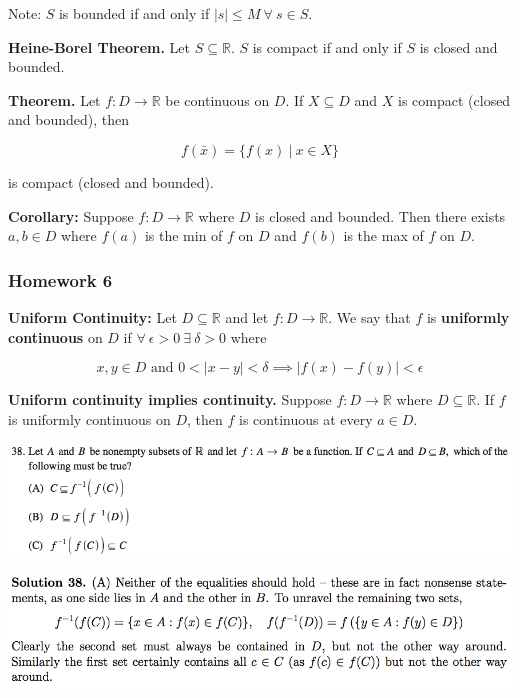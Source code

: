 \documentclass{article}
\begin{document}
Note: \(S\) is bounded if and only if \(|s| \leq M\  \forall \ s \in S \).

\textbf{Heine-Borel Theorem.} Let \(S \subseteq \mathbb{R}\). \(S\) is compact if and only if \(S\) is closed and bounded.


\textbf{Theorem.} Let \(f: D \to \mathbb{R}\) be continuous on \(D\). If \(X \subseteq D\) and \(X\) is compact (closed and bounded), then

\[
f(\bar{x}) = \{f(x) \ | \ x \in X\}
\]

is compact (closed and bounded).

\textbf{Corollary:} Suppose \(f: D \to \mathbb{R}\) where \(D\) is closed and bounded. Then there exists \(a, b \in D\) where \(f(a)\) is the min of \(f\) on \(D\) and \(f(b)\) is the max of \(f\) on \(D\).

\subsubsection{Homework 6}

\textbf{Uniform Continuity:} Let \(D \subseteq \mathbb{R}\) and let \(f: D \to \mathbb{R}\). We say that \(f\) is \textbf{uniformly continuous} on \(D\) if \(\forall \ \epsilon > 0 \ \exists \ \delta > 0\) where

\[
x, y \in D \text{ and } 0 < |x - y| < \delta \implies |f(x) - f(y)| < \epsilon
\]

\textbf{Uniform continuity implies continuity.} Suppose \(f:D \to \mathbb{R}\) where \(D \subseteq \mathbb{R}\). If \(f\) is uniformly continuous on \(D\), then \(f\) is continuous at every \(a \in D\).


%

\includegraphics[scale=0.5]{0568_38}

\includegraphics[scale=0.5]{0568_38s}
\end{document}
